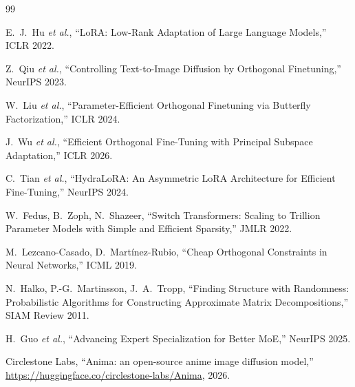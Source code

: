\documentclass[10pt]{article}
\begin{document}
\begin{thebibliography}{99}
\setlength{\itemsep}{0pt}

 E.~J.~Hu \emph{et al.},
``LoRA: Low-Rank Adaptation of Large Language Models,'' ICLR 2022.

 Z.~Qiu \emph{et al.},
``Controlling Text-to-Image Diffusion by Orthogonal Finetuning,''
NeurIPS 2023.

 W.~Liu \emph{et al.},
``Parameter-Efficient Orthogonal Finetuning via Butterfly
Factorization,'' ICLR 2024.

 J.~Wu \emph{et al.},
``Efficient Orthogonal Fine-Tuning with Principal Subspace
Adaptation,'' ICLR 2026.

 C.~Tian \emph{et al.},
``HydraLoRA: An Asymmetric LoRA Architecture for Efficient
Fine-Tuning,'' NeurIPS 2024.

 W.~Fedus, B.~Zoph, N.~Shazeer,
``Switch Transformers: Scaling to Trillion Parameter Models with
Simple and Efficient Sparsity,'' JMLR 2022.

 M.~Lezcano-Casado, D.~Mart\'inez-Rubio,
``Cheap Orthogonal Constraints in Neural Networks,'' ICML 2019.

 N.~Halko, P.-G.~Martinsson, J.~A.~Tropp,
``Finding Structure with Randomness: Probabilistic Algorithms for
Constructing Approximate Matrix Decompositions,'' SIAM Review 2011.

 H.~Guo \emph{et al.},
``Advancing Expert Specialization for Better MoE,'' NeurIPS 2025.

 Circlestone Labs,
``Anima: an open-source anime image diffusion model,''
\url{https://huggingface.co/circlestone-labs/Anima}, 2026.

\end{thebibliography}
\end{document}

